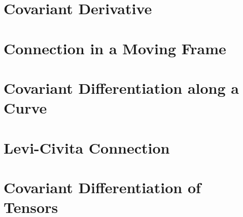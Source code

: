 \documentclass{article}
\begin{document}

\tableofcontents
\newpage

\section{Covariant Derivative}

\section{Connection in a Moving Frame}

\section{Covariant Differentiation along a Curve}

\section{Levi-Civita Connection}

\section{Covariant Differentiation of Tensors}
\end{document}
